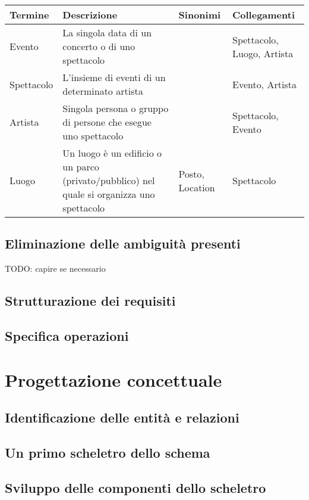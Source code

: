 \documentclass[a4paper,11pt]{article}
\begin{document}
\begin{tabularx}{\textwidth}{|X|X|X|X|}
\hline
Termine & Descrizione & Sinonimi & Collegamenti\\
\hline
Evento & La singola data di un concerto o di uno spettacolo &  & Spettacolo, Luogo, Artista\\
\hline
Spettacolo & L'insieme di eventi di un determinato artista &  & Evento, Artista\\
\hline
Artista & Singola persona o gruppo di persone che esegue uno spettacolo &  & Spettacolo, Evento\\
\hline
Luogo & Un luogo è un edificio o un parco (privato/pubblico) nel quale si organizza uno spettacolo & Posto, Location  & Spettacolo\\
\end{tabularx}

\subsection{Eliminazione delle ambiguità presenti}
TODO: capire se necessario


\subsection{Strutturazione dei requisiti}

\subsection{Specifica operazioni}

\section{Progettazione concettuale}

\subsection{Identificazione delle entità e relazioni}

\subsection{Un primo scheletro dello schema}

\subsection{Sviluppo delle componenti dello scheletro}
\end{document}
